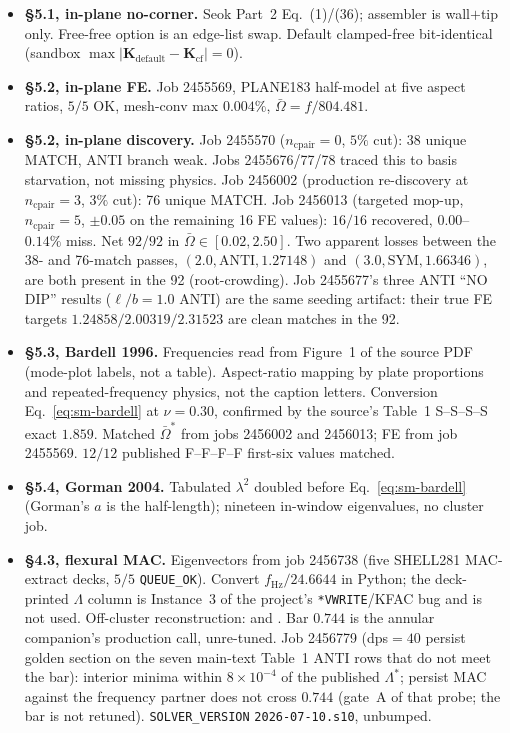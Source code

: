 \documentclass[11pt]{article}
\begin{document}
\begin{itemize}
entries, each paired with its own parity under Leissa's $(m,n)$ rather
than with the nearest frequency; three named near-misses (square
$\lambda=19.789$; $\ell/b=1.5$ $\lambda=58.201$ and $\lambda=67.494$)
discussed in the main text.
\item \textbf{\S5.1, in-plane no-corner.} Seok Part~2 Eq.~(1)/(36);
assembler is wall$+$tip only. Free-free option is an edge-list swap.
Default clamped-free bit-identical (sandbox
$\max|\mathbf{K}_{\mathrm{default}}-\mathbf{K}_{\mathrm{cf}}|=0$).
\item \textbf{\S5.2, in-plane FE.} Job 2455569, PLANE183 half-model at
five aspect ratios, $5/5$ OK, mesh-conv max $0.004\%$,
$\bar\Omega=f/804.481$.
\item \textbf{\S5.2, in-plane discovery.} Job 2455570
($n_{\mathrm{cpair}}=0$, $5\%$ cut): 38 unique MATCH, ANTI branch weak.
Jobs 2455676/77/78 traced this to basis starvation, not missing physics.
Job 2456002 (production re-discovery at $n_{\mathrm{cpair}}=3$, $3\%$
cut): 76 unique MATCH. Job 2456013 (targeted mop-up,
$n_{\mathrm{cpair}}=5$, $\pm 0.05$ on the remaining 16 FE values):
$16/16$ recovered, $0.00$--$0.14\%$ miss. Net $92/92$ in
$\bar\Omega\in[0.02,2.50]$. Two apparent losses between the 38- and
76-match passes, $(2.0,\mathrm{ANTI},1.27148)$ and
$(3.0,\mathrm{SYM},1.66346)$, are both present in the 92
(root-crowding). Job 2455677's three ANTI ``NO DIP'' results
($\ell/b=1.0$ ANTI) are the same seeding artifact: their true FE
targets $1.24858/2.00319/2.31523$ are clean matches in the 92.
\item \textbf{\S5.3, Bardell 1996.} Frequencies read from Figure~1 of
the source PDF (mode-plot labels, not a table). Aspect-ratio mapping by
plate proportions and repeated-frequency physics, not the caption
letters. Conversion Eq.~\eqref{eq:sm-bardell} at $\nu=0.30$, confirmed
by the source's Table~1 S--S--S--S exact $1.859$. Matched
$\bar\Omega^{*}$ from jobs
2456002 and 2456013; FE from job 2455569. $12/12$ published F--F--F--F
first-six values matched.
\item \textbf{\S5.4, Gorman 2004.} Tabulated $\lambda^2$ doubled before
Eq.~\eqref{eq:sm-bardell} (Gorman's $a$ is the half-length); nineteen
in-window eigenvalues, no cluster job.
\item \textbf{\S4.3, flexural MAC.} Eigenvectors from job 2456738 (five
SHELL281 MAC-extract decks, $5/5$ \texttt{QUEUE\_OK}). Convert
$f_{\mathrm{Hz}}/24.6644$ in Python; the deck-printed $\Lambda$ column
is Instance~3 of the project's \texttt{*VWRITE}/KFAC bug and is not
used. Off-cluster reconstruction:
 and
. Bar $0.744$
is the annular companion's production call, unre-tuned. Job 2456779
(dps$=40$ persist golden section on the seven main-text Table~1 ANTI rows
that do not meet the bar): interior minima within $8\times 10^{-4}$ of the
published
$\Lambda^{*}$; persist MAC against the frequency partner does not
cross $0.744$ (gate~A of that probe; the bar is not retuned).
\texttt{SOLVER\_VERSION} \texttt{2026-07-10.s10}, unbumped.
\end{itemize}
\end{document}
